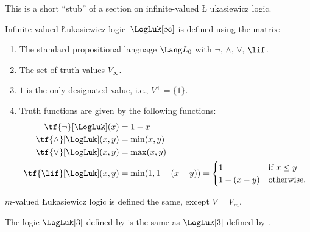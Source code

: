 \documentclass[../../../include/open-logic-section]{subfiles}
\begin{document}


\begin{editorial}
  This is a short ``stub'' of a section on infinite-valued \L
  ukasiewicz logic.
\end{editorial}

\begin{defn} Infinite-valued \L ukasiewicz
logic~$\LogLuk[\infty]$ is defined using the matrix:
\begin{enumerate}
  \item The standard propositional language $\Lang L_0$ with
  $\lnot$, $\land$, $\lor$, $\lif$.
  \item The set of truth values $V_\infty$.
  \item $1$ is the only designated value, i.e., $V^+ = \{1\}$.
  \item Truth functions are given by the following functions:
  \begin{align*}
    \tf{\lnot}[\LogLuk](x) & = 1 - x\\
    \tf{\land}[\LogLuk](x,y) & = \min(x,y)\\
    \tf{\lor}[\LogLuk](x,y) & = \max(x,y)\\
    \tf{\lif}[\LogLuk](x,y) & = \min(1,1-(x-y)) = \begin{cases}
      1 & \text{if } x \le y\\
      1-(x-y) & \text{otherwise.}
    \end{cases}
    \end{align*}
\end{enumerate}
$m$-valued \L ukasiewicz logic is defined the same, except $V = V_m$.
\end{defn}

\begin{prop}
  The logic $\LogLuk[3]$ defined by 
  is the same as $\LogLuk[3]$ defined by .
\end{prop}
\end{document}
